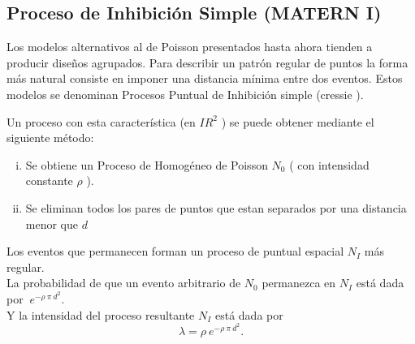 \documentclass[12pt]{report}
\begin{document}
			
			
			
			
			\subsection{Proceso de Inhibición Simple (MATERN I)}{ \label{Pcluster1} }
			
			
			
			Los modelos alternativos al de Poisson presentados hasta ahora tienden a producir diseños agrupados.  Para describir un patrón regular de puntos la forma más natural consiste en imponer una distancia mínima entre dos eventos. Estos modelos se denominan Procesos Puntual de Inhibición simple (cressie \cite{Cress}).
			
			Un proceso con esta característica (en $ I\!R^{2}$ ) se puede obtener mediante el siguiente método:
			
			
			
			
			\begin{enumerate}[i.-]
				
				\item Se obtiene un Proceso de Homogéneo de Poisson $N_{0}$ ( con intensidad constante $\rho$  ).
				
				\item  Se eliminan todos los pares de puntos que estan separados por una distancia menor que $d$
				
			\end{enumerate}
			
			Los eventos que permanecen forman un proceso de puntual espacial $N_{I}$ más regular.\\
			
			
			La probabilidad de que un evento arbitrario de $N_{0}$ permanezca en $N_{I}$  está dada por $ \: e^{- \rho \: \pi \: d^{2} } .$ \\
			
			Y la intensidad del proceso resultante  $N_{I}$ está dada por \[ \lambda = \rho \: e^{- \rho \: \pi \: d^{2}} .\]
			
			
\end{document}
